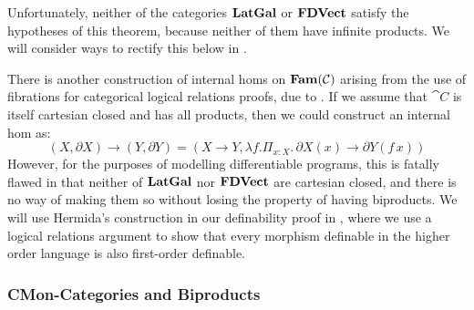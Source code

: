 Unfortunately, neither of the categories $\mathbf{LatGal}$ or $\mathbf{FDVect}$
satisfy the hypotheses of this theorem, because neither of them have
infinite products. We will consider ways to rectify this below in
.

\begin{remark}
  \label{rem:hermida-exponentials}
  There is another construction of internal homs on $\mathbf{Fam}(\mathcal{C})$
  arising from the use of fibrations for categorical logical relations
  proofs, due to \citet[Corollary 4.12]{hermida99}. If we assume that
  $\cat{C}$ is itself cartesian closed and has all products, then we
  could construct an internal hom as:
  \begin{displaymath}
    (X, \partial X) \to (Y, \partial Y) = (X \to Y, \lambda f. \Pi_{x : X}.\,\partial X(x) \to \partial Y(f\,x))
  \end{displaymath}
  However, for the purposes of modelling differentiable programs, this
  is fatally flawed in that neither of $\mathbf{LatGal}$ nor $\mathbf{FDVect}$ are
  cartesian closed, and there is no way of making them so without
  losing the property of having biproducts. We will use Hermida's
  construction in our definability proof in ,
  where we use a logical relations argument to show that every
  morphism definable in the higher order language is also first-order
  definable.
\end{remark}

\subsubsection{CMon-Categories and Biproducts}
\label{sec:biproducts}

